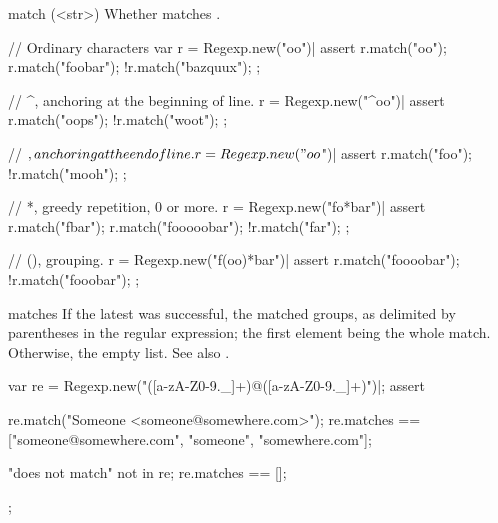 \begin{urbiscriptapi}
\item[match](<str>)%
  Whether \this matches .
\begin{urbiscript}
// Ordinary characters
var r = Regexp.new("oo")|
assert
{
  r.match("oo");
  r.match("foobar");
  !r.match("bazquux");
};

// ^, anchoring at the beginning of line.
r = Regexp.new("^oo")|
assert
{
  r.match("oops");
  !r.match("woot");
};

// $, anchoring at the end of line.
r = Regexp.new("oo$")|
assert
{
  r.match("foo");
  !r.match("mooh");
};

// *, greedy repetition, 0 or more.
r = Regexp.new("fo*bar")|
assert
{
  r.match("fbar");
  r.match("fooooobar");
  !r.match("far");
};

// (), grouping.
r = Regexp.new("f(oo)*bar")|
assert
{
  r.match("foooobar");
  !r.match("fooobar");
};
\end{urbiscript}


\item[matches]%
  If the latest  was successful, the matched groups, as
  delimited by parentheses in the regular expression; the first element
  being the whole match.  Otherwise, the empty list.  See also
  .

\begin{urbiscript}
var re = Regexp.new("([a-zA-Z0-9._]+)@([a-zA-Z0-9._]+)")|;
assert
{
  re.match("Someone <someone@somewhere.com>");
  re.matches == ["someone@somewhere.com", "someone", "somewhere.com"];

  "does not match" not in re;
  re.matches == [];
};
\end{urbiscript}
\end{urbiscriptapi}

